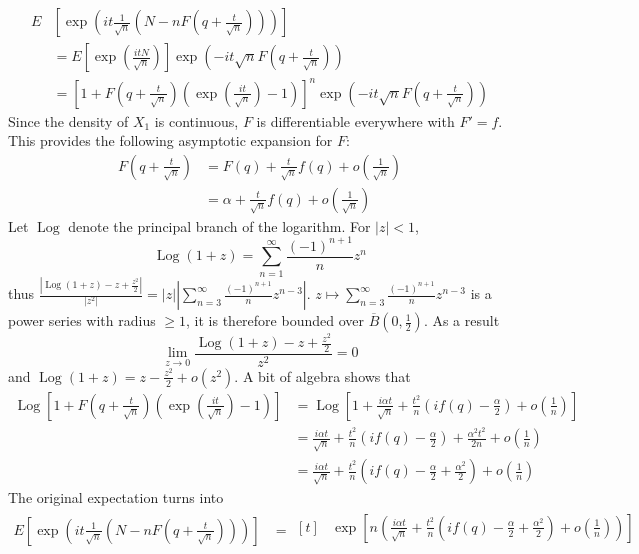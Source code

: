 \documentclass[a4paper,11pt]{article}
\DeclareMathOperator*{\Log}{Log}
\begin{document}
\begin{enumerate}
\begin{enumerate}
$$\begin{aligned}
      E&\left[\exp\left(it\frac{1}{\sqrt{n}}\left(N-n F\left(q+\frac t{\sqrt{n}}\right)\right)\right)\right]\\ 
      &= E\left[\exp\left(\frac{itN}{\sqrt n} \right) \right] \exp\left(-it\sqrt n F\left(q+\frac t{\sqrt{n}}\right) \right)\\
      &= \left[1+F\left(q+\frac t{\sqrt{n}}\right)\left(\exp\left(\frac{it}{\sqrt n}\right)-1 \right) \right]^n \exp\left(-it\sqrt n F\left(q+\frac t{\sqrt{n}}\right) \right)
    \end{aligned}$$
    Since the density of $X_1$ is continuous, $F$ is differentiable everywhere with $F'=f$. This provides the following asymptotic expansion for $F$:
    $$\begin{aligned}
      F\left(q+\frac t{\sqrt{n}}\right) &= F(q) + \frac t{\sqrt{n}} f(q) + o\left(\frac 1{\sqrt{n}} \right)\\
      &= \alpha + \frac t{\sqrt{n}} f(q) + o\left(\frac 1{\sqrt{n}} \right)
    \end{aligned}$$
    Let $\Log$ denote the principal branch of the logarithm. For $|z|<1$, $$\Log(1+z) = \sum_{n=1}^\infty \frac{(-1)^{n+1}}{n}z^n$$
    thus $\displaystyle \frac{|\Log(1+z)-z+\frac{z^2}2|}{|z^2|} = |z|\left|\sum_{n=3}^\infty \frac{(-1)^{n+1}}{n}z^{n-3}\right|$. $\displaystyle z\mapsto \sum_{n=3}^\infty \frac{(-1)^{n+1}}{n}z^{n-3}$ is a power series with radius $\geq 1$, it is therefore bounded over $\overline B(0,\frac 12)$. As a result $$\lim_{z\to 0} \frac{\Log(1+z)-z+\frac{z^2}2}{z^2} = 0$$
    and $\Log(1+z) = z-\frac{z^2}2 + o(z^2)$. A bit of algebra shows that 
    $$\begin{aligned}
    \Log \left[1+F\left(q+\frac t{\sqrt{n}}\right)\left(\exp\left(\frac{it}{\sqrt n}\right)-1 \right) \right] &= \Log[1 + \frac{i\alpha t}{\sqrt n} + \frac{t^2}n \left(if(q)-\frac \alpha 2\right) + o\left(\frac 1n \right)]\\
    &=\frac{i\alpha t}{\sqrt n} + \frac{t^2}n \left(if(q)-\frac \alpha 2\right) +\frac{\alpha^2 t^2}{2n} + o\left(\frac 1n \right)\\
    &=\frac{i\alpha t}{\sqrt n} + \frac{t^2}n \left(if(q)-\frac \alpha 2+\frac {\alpha^2} 2\right) + o\left(\frac 1n \right)
    \end{aligned}
    $$
    The original expectation turns into
    $$\begin{aligned}
    E\left[\exp\left(it\frac{1}{\sqrt{n}}\left(N-n F\left(q+\frac t{\sqrt{n}}\right)\right)\right)\right] &= \begin{aligned}[t]
    &\exp\left[n\left(\frac{i\alpha t}{\sqrt n} + \frac{t^2}n \left(if(q)-\frac \alpha 2+\frac {\alpha^2} 2\right) + o\left(\frac 1n \right) \right)\right]\\

\end{aligned}
\end{aligned}$$
\end{enumerate}
\end{enumerate}
\end{document}
